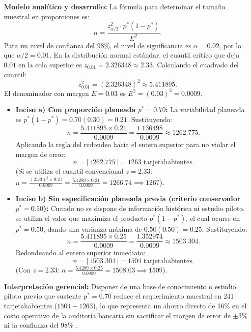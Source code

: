 {\textbf{Modelo analítico y desarrollo:}
La fórmula para determinar el tamaño muestral en proporciones es:
\[
  n = \frac{z_{\alpha/2}^2 \cdot p^*(1-p^*)}{E^2}.
\]
Para un nivel de confianza del 98\%, el nivel de significancia es $\alpha = 0.02$, por lo que $\alpha/2 = 0.01$. En la distribución normal estándar, el cuantil crítico que deja $0.01$ en la cola superior es $z_{0.01} = 2.326348 \approx 2.33$.
Calculando el cuadrado del cuantil:
\[
  z_{0.01}^2 = (2.326348)^2 \approx 5.411895.
\]
El denominador con margen $E = 0.03$ es $E^2 = (0.03)^2 = 0.0009$.
\begin{itemize}
  \item \textbf{Inciso a) Con proporción planeada $p^* = 0.70$:}
  La variabilidad planeada es $p^*(1-p^*) = 0.70(0.30) = 0.21$. Sustituyendo:
  \[
    n = \frac{5.411895 \times 0.21}{0.0009} = \frac{1.136498}{0.0009} \approx 1262.775.
  \]
  Aplicando la regla del redondeo hacia el entero superior para no violar el margen de error:
  \[
    n = \lceil 1262.775 \rceil = 1263 \text{ tarjetahabientes}.
  \]
  (Si se utiliza el cuantil convencional $z = 2.33$: $n = \frac{(2.33)^2 \times 0.21}{0.0009} = \frac{5.4289 \times 0.21}{0.0009} = 1266.74 \implies 1267$).
  \item \textbf{Inciso b) Sin especificación planeada previa (criterio conservador $p^* = 0.50$):}
  Cuando no se dispone de información histórica ni estudio piloto, se utiliza el valor que maximiza el producto $p^*(1-p^*)$, el cual ocurre en $p^* = 0.50$, dando una varianza máxima de $0.50(0.50) = 0.25$. Sustituyendo:
  \[
    n = \frac{5.411895 \times 0.25}{0.0009} = \frac{1.352974}{0.0009} \approx 1503.304.
  \]
  Redondeando al entero superior inmediato:
  \[
    n = \lceil 1503.304 \rceil = 1504 \text{ tarjetahabientes}.
  \]
  (Con $z = 2.33$: $n = \frac{5.4289 \times 0.25}{0.0009} = 1508.03 \implies 1509$).
\end{itemize}
\textbf{Interpretación gerencial:} Disponer de una base de conocimiento o estudio piloto previo que sustente $p^* = 0.70$ reduce el requerimiento muestral en 241 tarjetahabientes ($1504 - 1263$), lo que representa un ahorro directo de 16\% en el costo operativo de la auditoría bancaria sin sacrificar el margen de error de $\pm 3\%$ ni la confianza del 98\% \citep{lind2012}.

}
